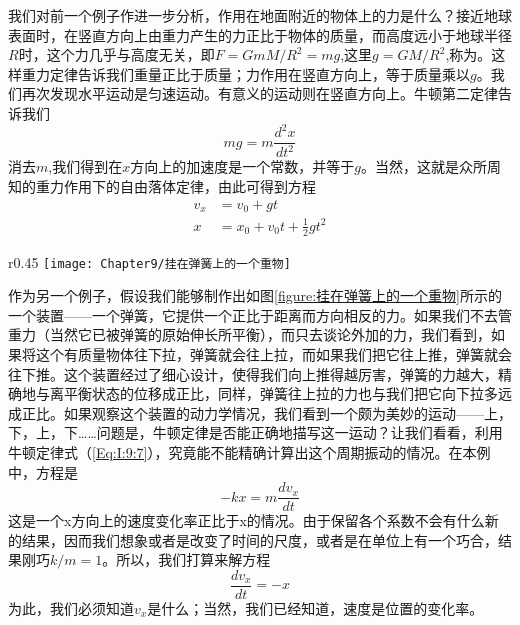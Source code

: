 我们对前一个例子作进一步分析，作用在地面附近的物体上的力是什么？接近地球表面时，在竖直方向上由重力产生的力正比于物体的质量，而高度远小于地球半径$R$时，这个力几乎与高度无关，即$F=GmM/R^2=mg$,这里$g=GM/R^2$,称为。这样重力定律告诉我们重量正比于质量；力作用在竖直方向上，等于质量乘以$g$。我们再次发现水平运动是匀速运动。有意义的运动则在竖直方向上。牛顿第二定律告诉我们
\begin{equation}
    \label{Eq:I:9:9}
    mg=m\frac{d^2x}{dt^2}
\end{equation}
消去$m$,我们得到在$x$方向上的加速度是一个常数，并等于$g$。当然，这就是众所周知的重力作用下的自由落体定律，由此可得到方程
\begin{equation}
    \label{Eq:I:9:10}
    \begin{aligned}
        v_x&=v_0+gt \\
        x&=x_0+v_0t+\frac{1}{2}gt^2
    \end{aligned}
\end{equation}

\begin{wrapfigure}{r}{0.45\textwidth}
    \centering
    \texttt{[image: Chapter9/挂在弹簧上的一个重物]}
    \caption{挂在弹簧上的一个重物}
    \label{figure:挂在弹簧上的一个重物}
\end{wrapfigure}
作为另一个例子，假设我们能够制作出如图\ref{figure:挂在弹簧上的一个重物}所示的一个装置——一个弹簧，它提供一个正比于距离而方向相反的力。如果我们不去管重力（当然它已被弹簧的原始伸长所平衡），而只去谈论外加的力，我们看到，如果将这个有质量物体往下拉，弹簧就会往上拉，而如果我们把它往上推，弹簧就会往下推。这个装置经过了细心设计，使得我们向上推得越厉害，弹簧的力越大，精确地与离平衡状态的位移成正比，同样，弹簧往上拉的力也与我们把它向下拉多远成正比。如果观察这个装置的动力学情况，我们看到一个颇为美妙的运动——上，下，上，下……问题是，牛顿定律是否能正确地描写这一运动？让我们看看，利用牛顿定律式（\ref{Eq:I:9:7}），究竟能不能精确计算出这个周期振动的情况。在本例中，方程是
\begin{equation}
    \label{Eq:I:9:11}
    -kx=m\frac{dv_x}{dt}
\end{equation}
这是一个x方向上的速度变化率正比于x的情况。由于保留各个系数不会有什么新的结果，因而我们想象或者是改变了时间的尺度，或者是在单位上有一个巧合，结果刚巧$k/m=1$。所以，我们打算来解方程
\begin{equation}
    \label{Eq:I:9:12}
    \frac{dv_x}{dt}=-x
\end{equation}
为此，我们必须知道$v_x$是什么；当然，我们已经知道，速度是位置的变化率。

